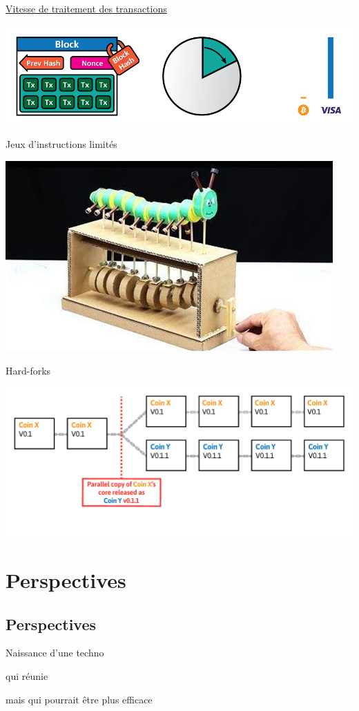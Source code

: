 \documentclass[presentation]{beamer}
\begin{document}
\begin{frame}[label={sec:orgfca2973}]{\href{https://www.blockchain.com/explorer/charts/transactions-per-second}{Vitesse de traitement des transactions}}
\begin{center}
\includegraphics[width=\textwidth]{Pictures/cryptographics/the-scaling-issue.png}
\end{center}
\end{frame}
\begin{frame}[label={sec:org1637eed}]{Jeux d'instructions limités}
\begin{center}
\includegraphics[width=.9\textwidth]{Pictures/automate_simple.jpeg}
\end{center}
\end{frame}
\begin{frame}[label={sec:org4a9b083}]{Hard-forks}
\begin{center}
\includegraphics[width=.9\textwidth]{Pictures/cryptographics/blockchain-hard-fork.png}
\end{center}
\end{frame}

\section{Perspectives}
\label{sec:orgf147ad8}
\subsection{Perspectives}
\label{sec:orgb129057}
\begin{frame}[label={sec:orgeeebfab}]{}
\begin{block}{Naissance d'une techno}
\end{block}
\begin{block}{qui réunie}
\end{block}
\begin{block}{mais qui pourrait être plus efficace}
\end{block}
\end{frame}
\end{document}
